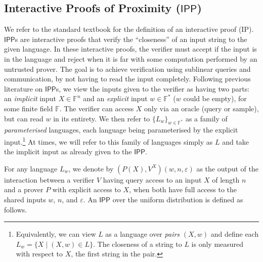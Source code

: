 \documentclass[10pt,a4paper]{article}
\newcommand{\IPP}{\mathsf{IPP}}
\newcommand{\F}{\mathbb{F}}
\begin{document}
\subsection{Interactive Proofs of Proximity ($\IPP$)}
We refer to the standard textbook \cite{AB09} for the definition of an interactive proof (IP). 
$\IPP$s \cite{EKR04,RVW} are interactive proofs that verify the ``closeness'' of an input string to the given language. In these interactive proofs, the verifier must accept if the input is in the language and reject when it is far with some computation performed by an untrusted prover. The goal is to achieve verification using sublinear queries and communication, by not having to read the input completely. Following previous literature on $\IPP$s, we view the inputs given to the verifier as having two parts: an \textit{implicit} input $X \in \F^n$ and an \textit{explicit} input $w \in \F^*$ ($w$ could be empty), for some finite field $\F$. The verifier can access $X$ only via an oracle (query or sample), but can read $w$ in its entirety. We then refer to $\{L_w\}_{w \in \F^*}$ as a family of \textit{parameterised} languages, each language being parameterised by the explicit input.\footnote{Equivalently, we can view $L$ as a language over \textit{pairs} $(X,w)$ and define each $L_w = \{X \mid (X,w) \in L\}$. The closeness of a string to $L$ is only measured with respect to $X$, the first string in the pair.} At times, we will refer to this family of languages simply as $L$ and take the implicit input as already given to the $\IPP$.

For any language $L_w$, we denote by $(P(X),V^{X})(w, n, \varepsilon)$ as the output of the interaction between a verifier $V$ having query access to an input $X$ of length $n$ and a prover $P$ with explicit access to $X$, when both have full access to the shared inputs $w$, $n$, and $\varepsilon$. An $\IPP$ over the uniform distribution is defined as follows.
\end{document}
